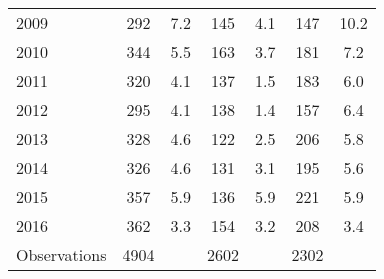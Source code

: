 \begin{table}[htbp]
\begin{tabular}{l*{3}{cc}}
2009                &         292&         7.2&         145&         4.1&         147&        10.2\\
2010                &         344&         5.5&         163&         3.7&         181&         7.2\\
2011                &         320&         4.1&         137&         1.5&         183&         6.0\\
2012                &         295&         4.1&         138&         1.4&         157&         6.4\\
2013                &         328&         4.6&         122&         2.5&         206&         5.8\\
2014                &         326&         4.6&         131&         3.1&         195&         5.6\\
2015                &         357&         5.9&         136&         5.9&         221&         5.9\\
2016                &         362&         3.3&         154&         3.2&         208&         3.4\\
\hline
Observations        &        4904&            &        2602&            &        2302&            \\
\hline\hline
\end{tabular}
\end{table}
